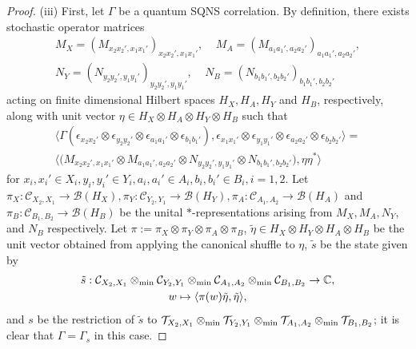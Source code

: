 \documentclass[11pt]{amsart}
\newcommand{\cl}[1]{\mathcal{#1}}
\newcommand{\bb}[1]{\mathbb{#1}}
\begin{document}
\begin{proof}
(iii) First, let $\Gamma$ be a quantum SQNS correlation. By definition, there exists stochastic operator matrices
\begin{gather*}
	M_{X} = (M_{x_{2}x_{2}', x_{1}x_{1}'})_{x_{2}x_{2}', x_{1}x_{1}'}, \;\;\;\; M_{A} = (M_{a_{1}a_{1}', a_{2}a_{2}'})_{a_{1}a_{1}', a_{2}a_{2}'}, 
\\ 	N_{Y} = (N_{y_{2}y_{2}', y_{1}y_{1}'})_{y_{2}y_{2}', y_{1}y_{1}'}, \;\;\;\; N_{B} = (N_{b_{1}b_{1}', b_{2}b_{2}'})_{b_{1}b_{1}', b_{2}b_{2}'}
\end{gather*}
\noindent acting on finite dimensional Hilbert spaces $H_{X}, H_{A}, H_{Y}$ and $H_{B}$, respectively, along with unit vector $\eta \in H_{X}\otimes H_{A}\otimes H_{Y}\otimes H_{B}$ such that
\begin{gather*}
	\langle \Gamma(\epsilon_{x_{2}x_{2}'}\otimes \epsilon_{y_{2}y_{2}'}\otimes \epsilon_{a_{1}a_{1}'}\otimes \epsilon_{b_{1}b_{1}'}), \epsilon_{x_{1}x_{1}'}\otimes \epsilon_{y_{1}y_{1}'}\otimes \epsilon_{a_{2}a_{2}'}\otimes \epsilon_{b_{2}b_{2}'}\rangle =
\\ \bigg\langle \big(M_{x_{2}x_{2}', x_{1}x_{1}'}\otimes M_{a_{1}a_{1}', a_{2}a_{2}'}\otimes N_{y_{2}y_{2}', y_{1}y_{1}'}\otimes N_{b_{1}b_{1}', b_{2}b_{2}'}\big), \eta\eta^{*}\bigg\rangle
\end{gather*}
\noindent for $x_{i}, x_{i}' \in X_{i}, y_{i}, y_{i}' \in Y_{i}, a_{i}, a_{i}' \in A_{i}, b_{i}, b_{i}' \in B_{i}, i = 1, 2$. Let $\pi_{X}: \cl{C}_{X_{2}, X_{1}}\rightarrow \cl{B}(H_{X}), \pi_{Y}: \cl{C}_{Y_{2}, Y_{1}}\rightarrow \cl{B}(H_{Y}), \pi_{A}: \cl{C}_{A_{1}, A_{2}}\rightarrow \cl{B}(H_{A})$ and $\pi_{B}: \cl{C}_{B_{1}, B_{2}}\rightarrow \cl{B}(H_{B})$ be the unital $*$-representations arising from $M_{X}, M_{A}, N_{Y}$, and $N_{B}$ respectively. Let $\pi := \pi_{X}\otimes \pi_{Y}\otimes \pi_{A}\otimes \pi_{B}$, $\tilde{\eta} \in H_{X}\otimes H_{Y}\otimes H_{A}\otimes H_{B}$ be the unit vector obtained from applying the canonical shuffle to $\eta$, $\tilde{s}$ be the state given by
\begin{gather*}
	\tilde{s}: \cl{C}_{X_{2}, X_{1}}\otimes_{\rm min} \cl{C}_{Y_{2}, Y_{1}}\otimes_{\rm min} \cl{C}_{A_{1}, A_{2}}\otimes_{\rm min} \cl{C}_{B_{1}, B_{2}}\rightarrow \bb{C}, 
\\	w \mapsto \langle \pi(w)\tilde{\eta}, \tilde{\eta}\rangle,
\end{gather*}
\noindent and $s$ be the restriction of $\tilde{s}$ to $\cl{T}_{X_{2}, X_{1}}\otimes_{\rm min} \cl{T}_{Y_{2}, Y_{1}}\otimes_{\rm min} \cl{T}_{A_{1}, A_{2}}\otimes_{\rm min}\cl{T}_{B_{1}, B_{2}}$; it is clear that $\Gamma = \Gamma_{s}$ in this case. 


\end{proof}
\end{document}
